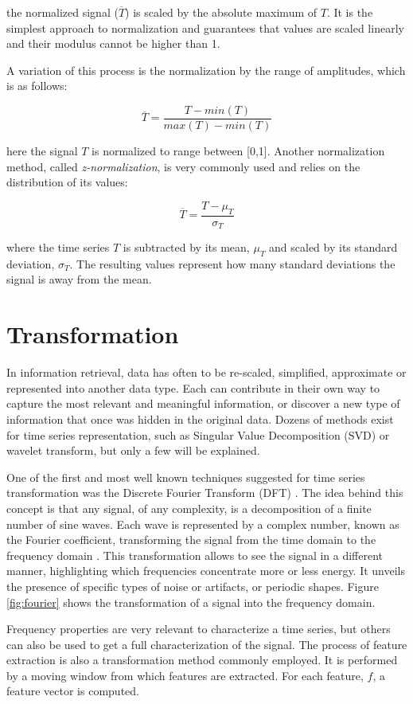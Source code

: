 the normalized signal ($\overline{T}$) is scaled by the absolute maximum of $T$. It is the simplest approach to normalization and guarantees that values are scaled linearly and their modulus cannot be higher than 1.
\par
A variation of this process is the normalization by the range of amplitudes, which is as follows:

\begin{equation}
\overline{T} = \frac{T-min(T)}{max(T)-min(T)}
\end{equation}

here the signal $T$ is normalized to range between [0,1].
Another normalization method, called \textit{z-normalization}, is very commonly used and relies on the distribution of its values:

\begin{equation}
\overline{T} = \frac{T-\mu_T}{\sigma_T}
\end{equation}

where the time series $T$ is subtracted by its mean, $\mu_T$ and scaled by its standard deviation, $\sigma_T$. The resulting values represent how many standard deviations the signal is away from the mean.


\section{Transformation} 
\label{subsec:transform}

In information retrieval, data has often to be re-scaled, simplified, approximate or represented into another data type. Each can contribute in their own way to capture the most relevant and meaningful information, or discover a new type of information that once was hidden in the original data. Dozens of methods exist for time series representation, such as Singular Value Decomposition (SVD) or wavelet transform, but only a few will be explained.
\par
One of the first and most well known techniques suggested for time series transformation was the Discrete Fourier Transform (DFT) \citep{fourier}. The idea behind this concept is that any signal, of any complexity, is a decomposition of a finite number of sine waves. Each wave is represented by a complex number, known as the Fourier coefficient, transforming the signal from the time domain to the frequency domain \cite{fourier2}. This transformation allows to see the signal in a different manner, highlighting which frequencies concentrate more or less energy. It unveils the presence of specific types of noise or artifacts, or periodic shapes. Figure \ref{fig:fourier} shows the transformation of a signal into the frequency domain.
\par
Frequency properties are very relevant to characterize a time series, but others can also be used to get a full characterization of the signal. The process of feature extraction is also a transformation method commonly employed. It is performed by a moving window from which features are extracted. For each feature, $f$, a feature vector is computed.

